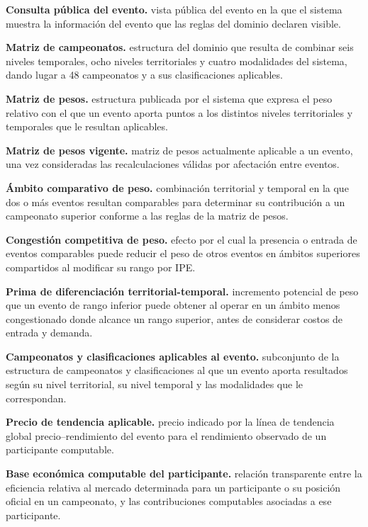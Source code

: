 \documentclass[10pt,letterpaper]{article}
\begin{document}
\noindent\textbf{Consulta pública del evento.} vista pública del evento en la que el sistema muestra la información del evento que las reglas del dominio declaren visible.\par
\noindent\textbf{Matriz de campeonatos.} estructura del dominio que resulta de combinar seis niveles temporales, ocho niveles territoriales y cuatro modalidades del sistema, dando lugar a 48 campeonatos y a sus clasificaciones aplicables.\par
\noindent\textbf{Matriz de pesos.} estructura publicada por el sistema que expresa el peso relativo con el que un evento aporta puntos a los distintos niveles territoriales y temporales que le resultan aplicables.\par
\noindent\textbf{Matriz de pesos vigente.} matriz de pesos actualmente aplicable a un evento, una vez consideradas las recalculaciones válidas por afectación entre eventos.\par
\noindent\textbf{Ámbito comparativo de peso.} combinación territorial y temporal en la que dos o más eventos resultan comparables para determinar su contribución a un campeonato superior conforme a las reglas de la matriz de pesos.\par
\noindent\textbf{Congestión competitiva de peso.} efecto por el cual la presencia o entrada de eventos comparables puede reducir el peso de otros eventos en ámbitos superiores compartidos al modificar su rango por IPE.\par
\noindent\textbf{Prima de diferenciación territorial-temporal.} incremento potencial de peso que un evento de rango inferior puede obtener al operar en un ámbito menos congestionado donde alcance un rango superior, antes de considerar costos de entrada y demanda.\par
\noindent\textbf{Campeonatos y clasificaciones aplicables al evento.} subconjunto de la estructura de campeonatos y clasificaciones al que un evento aporta resultados según su nivel territorial, su nivel temporal y las modalidades que le correspondan.\par
\noindent\textbf{Precio de tendencia aplicable.} precio indicado por la línea de tendencia global precio--rendimiento del evento para el rendimiento observado de un participante computable.\par
\noindent\textbf{Base económica computable del participante.} relación transparente entre la eficiencia relativa al mercado determinada para un participante o su posición oficial en un campeonato, y las contribuciones computables asociadas a ese participante.\par
\end{document}
